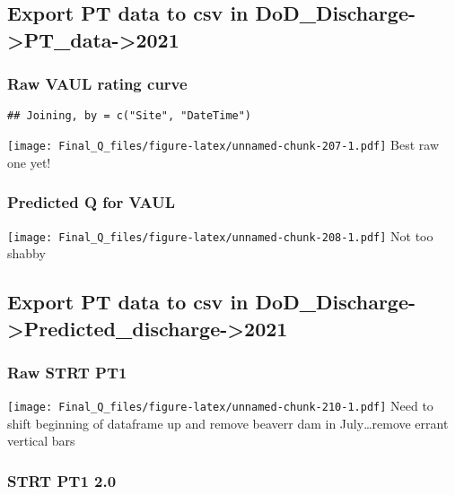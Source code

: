 \documentclass[
]{article}
\begin{document}
\hypertarget{export-pt-data-to-csv-in-dod_discharge-pt_data-2021-3}{%
\subsection{Export PT data to csv in
DoD\_Discharge-\textgreater PT\_data-\textgreater2021}\label{export-pt-data-to-csv-in-dod_discharge-pt_data-2021-3}}

\hypertarget{raw-vaul-rating-curve}{%
\subsubsection{Raw VAUL rating curve}\label{raw-vaul-rating-curve}}

\begin{verbatim}
## Joining, by = c("Site", "DateTime")
\end{verbatim}

\texttt{[image: Final\_Q\_files/figure-latex/unnamed-chunk-207-1.pdf]}
Best raw one yet!

\hypertarget{predicted-q-for-vaul-1}{%
\subsubsection{Predicted Q for VAUL}\label{predicted-q-for-vaul-1}}

\texttt{[image: Final\_Q\_files/figure-latex/unnamed-chunk-208-1.pdf]} Not
too shabby

\hypertarget{export-pt-data-to-csv-in-dod_discharge-predicted_discharge-2021-3}{%
\subsection{Export PT data to csv in
DoD\_Discharge-\textgreater Predicted\_discharge-\textgreater2021}\label{export-pt-data-to-csv-in-dod_discharge-predicted_discharge-2021-3}}

\hypertarget{raw-strt-pt1-2}{%
\subsubsection{Raw STRT PT1}\label{raw-strt-pt1-2}}

\texttt{[image: Final\_Q\_files/figure-latex/unnamed-chunk-210-1.pdf]}
Need to shift beginning of dataframe up and remove beaverr dam in
July\ldots remove errant vertical bars

\hypertarget{strt-pt1-2.0-2}{%
\subsubsection{STRT PT1 2.0}\label{strt-pt1-2.0-2}}
\end{document}
